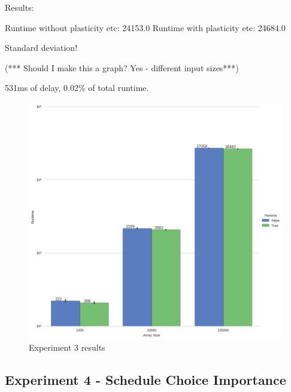 Results:

Runtime without plasticity etc: 24153.0
Runtime with plasticity etc:    24684.0

Standard deviation!

(*** Should I make this a graph? Yes - different input sizes***)

531ms of delay, 0.02\% of total runtime.

\begin{figure}
	\centering
	\includegraphics[width=\textwidth]{graphics/experiment3.png}
	\caption{Experiment 3 results}
	\label{fig:results_ex3}
\end{figure}





\subsection{Experiment 4 - Schedule Choice Importance}

